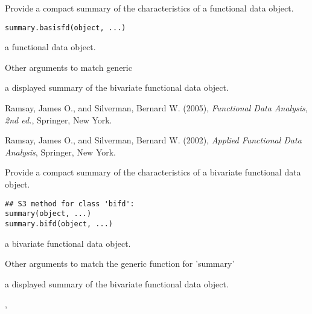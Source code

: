 \documentclass{article}
\begin{document}
\begin{Description}\relax
Provide a compact summary of the characteristics of a
functional data object.
\end{Description}
\begin{Usage}
\begin{verbatim}
summary.basisfd(object, ...)
\end{verbatim}
\end{Usage}
\begin{Arguments}
\begin{ldescription}
\item[\code{object}] a functional data object.

\item[\code{...}] Other arguments to match generic
\end{ldescription}
\end{Arguments}
\begin{Value}
a displayed summary of the bivariate functional data object.
\end{Value}
\begin{References}\relax
Ramsay, James O., and Silverman, Bernard W. (2005), \emph{Functional 
Data Analysis, 2nd ed.}, Springer, New York. 

Ramsay, James O., and Silverman, Bernard W. (2002), \emph{Applied
Functional Data Analysis}, Springer, New York.
\end{References}

\begin{Description}\relax
Provide a compact summary of the characteristics of a
bivariate functional data object.
\end{Description}
\begin{Usage}
\begin{verbatim}
## S3 method for class 'bifd':
summary(object, ...)
summary.bifd(object, ...)
\end{verbatim}
\end{Usage}
\begin{Arguments}
\begin{ldescription}
\item[\code{object}] a bivariate functional data object.

\item[\code{...}] Other arguments to match the generic function for 'summary'
\end{ldescription}
\end{Arguments}
\begin{Value}
a displayed summary of the bivariate functional data object.
\end{Value}
\begin{SeeAlso}\relax
{},
\end{SeeAlso}
\end{document}
